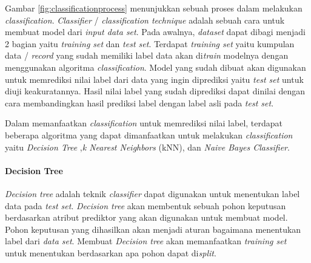 \documentclass[a4paper,twoside]{article}
\begin{document}
\begin{enumerate}
Gambar \ref{fig:classificationprocess} menunjukkan sebuah proses dalam melakukan \textit{classification}. \textit{Classifier} / \textit{classification technique} adalah sebuah cara untuk membuat model dari \textit{input data set}. Pada awalnya, \textit{dataset} dapat dibagi menjadi 2 bagian yaitu \textit{training set} dan \textit{test set}. Terdapat \textit{training set} yaitu kumpulan data / \textit{record} yang sudah memiliki label data akan di\textit{train} modelnya dengan menggunakan algoritma \textit{classification}. Model yang sudah dibuat akan digunakan untuk memrediksi nilai label dari data yang ingin diprediksi yaitu \textit{test set} untuk diuji keakuratannya. Hasil nilai label yang sudah diprediksi dapat dinilai dengan cara membandingkan hasil prediksi label dengan label asli pada \textit{test set}.


Dalam memanfaatkan \textit{classification} untuk memrediksi nilai label, terdapat beberapa algoritma yang dapat dimanfaatkan untuk melakukan \textit{classification} yaitu \textit{Decision Tree} ,\textit{k Nearest Neighbors} (kNN), dan \textit{Naive Bayes Classifier}.

\paragraph{Decision Tree} 
\textit{Decision tree} adalah teknik \textit{classifier} dapat digunakan untuk menentukan label data pada \textit{test set}. \textit{Decision tree} akan membentuk sebuah pohon keputusan berdasarkan atribut prediktor yang akan digunakan untuk membuat model. Pohon keputusan yang dihasilkan akan menjadi aturan bagaimana menentukan label dari \textit{data set}. Membuat \textit{Decision tree} akan memanfaatkan \textit{training set} untuk menentukan berdasarkan apa pohon dapat di\textit{split}. 


\end{enumerate}
\end{document}

